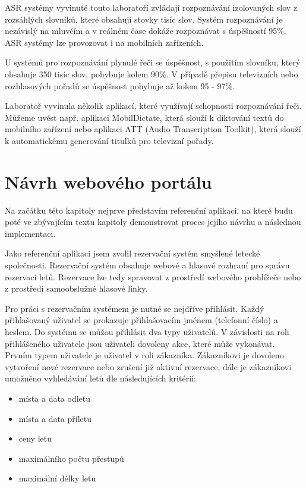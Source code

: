 \documentclass[ing,male,java,dept460]{diploma}						%
\begin{document}
ASR systémy vyvinuté touto laboratoří zvládají rozpoznávání izolovaných slov z rozsáhlých slovníků, které obsahují stovky tisíc slov. Systém rozpoznávání je nezávislý na mluvčím a v reálném čase dokáže rozpoznávat s úspěšností 95\%. ASR systémy lze provozovat i na mobilních zařízeních.

U systémů pro rozpoznávání plynulé řeči se úspěšnost, s použitím slovníku, který obsahuje 350 tisíc slov, pohybuje kolem 90\%. V případě přepisu televizních nebo rozhlasových pořadů se úspěšnost pohybuje až kolem 95 - 97\%.

Laboratoř vyvinula několik aplikací, které využívají schopnosti rozpoznávání řeči. Můžeme uvést např. aplikaci MobilDictate, která slouží k diktování textů do mobilního zařízení nebo aplikaci ATT (Audio Transcription Toolkit), která slouží k automatickému generování titulků pro televizní pořady.


\section{Návrh webového portálu}
\label{sec:Navrh}
Na začátku této kapitoly nejprve představím referenční aplikaci, na které budu poté ve zbývajícím textu kapitoly demonstrovat proces jejího návrhu a následnou implementaci.

Jako referenční aplikaci jsem zvolil rezervační systém smyšlené letecké společnosti. Rezervační systém obsahuje webové a hlasové rozhraní pro správu rezervací letů. Rezervace lze tedy spravovat z prostředí webového prohlížeče nebo z prostředí samoobslužné hlasové linky.

Pro práci s rezervačním systémem je nutné se nejdříve přihlásit. Každý přihlašovaný uživatel se prokazuje přihlašovacím jménem (telefonní číslo) a heslem. Do systému se můžou přihlásit dva typy uživatelů. V závislosti na roli přihlášeného uživatele jsou uživateli dovoleny akce, které může vykonávat. Prvním typem uživatele je uživatel v roli zákazníka. Zákazníkovi je dovoleno vytvoření nové rezervace nebo zrušení již aktivní rezervace, dále je zákazníkovi umožněno vyhledávání letů dle následujících kritérií:

\begin{itemize}
\item místa a data odletu
\item místa a data příletu
\item ceny letu
\item maximálního počtu přestupů
\item maximální délky letu
\end{itemize}
\end{document}
